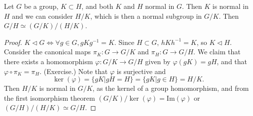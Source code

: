 \documentclass{article}
\begin{document}
\begin{theorem}
Let $G$ be a group, $K \subset H$, and both $K$ and $H$ normal in
$G$. Then $K$ is normal in $H$ and we can consider $H / K$, which is
then a normal subgroup in $G / K$. Then $G / H \simeq (G / K) / (H / K)$.
\end{theorem}
\begin{proof}
$K \triangleleft G \iff \forall g \in G, g K g^{-1} = K$. Since
$H \subset G$, $h K h^{-1} = K$, so $K \triangleleft H$. Consider the
canonical maps $\pi_K : G \to G / K$ and
$\pi_H : G \to G / H$. We claim that there exists a homomorphism
$\varphi : G / K \to G / H$ given by $\varphi(gK) = gH$, and that
$\varphi \circ \pi_K = \pi_H$. (Exercise.) Note that $\varphi$ is
surjective and 
$$
\ker(\varphi) 
  = \{ gK | gH = H \} 
  = \{ gK | g \in H \}
  = H / K.
$$
Then $H / K$ is normal in $G / K$, as the kernel of a group
homomorphism, and from the first isomorphism theorem
$(G / K) / \ker(\varphi) = \mathrm{Im}(\varphi)$
or $(G / H) / (H / K) \simeq G / H$.
\end{proof}
\end{document}
